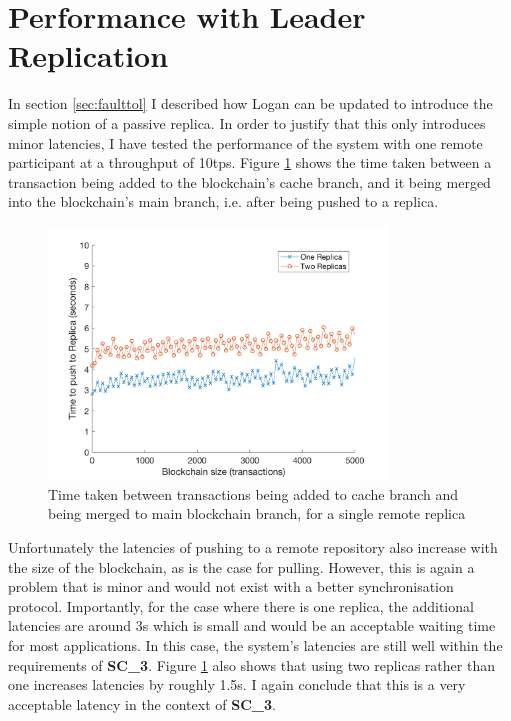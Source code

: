 \documentclass[12pt,a4paper,twoside,openright]{report}
\begin{document}
	\section{Performance with Leader Replication}
	In section \ref{sec:faulttol} I described how Logan can be updated to introduce the simple notion of a passive replica. 
	In order to justify that this only introduces minor latencies, I have tested the performance of the system with one remote participant at a throughput of 10tps. 
	Figure \ref{figs:confirmationtimes}  shows the time taken between a transaction being added to the blockchain's cache branch, and it being merged into the blockchain's main branch, i.e. after being pushed to a replica.
	\begin{figure}
		\centering
		\includegraphics[width=0.8\textwidth]{figs/confirmationlatencies.png}
		\caption{Time taken between transactions being added to cache branch and being merged to main blockchain branch, for a single remote replica}
		\label{figs:confirmationtimes}
	\end{figure}
	Unfortunately the latencies of pushing to a remote repository also increase with the size of the blockchain, as is the case for pulling.
	However, this is again a problem that is minor and would not exist with a better synchronisation protocol. 
	Importantly, for the case where there is one replica, the additional latencies are around 3s which is small and would be an acceptable waiting time for most applications.
	In this case, the system's latencies are still well within the requirements of \textbf{SC\_3}.
	Figure \ref{figs:confirmationtimes} also shows that using two replicas rather than one increases latencies by roughly 1.5s. 
	I again conclude that this is a very acceptable latency in the context of \textbf{SC\_3}.\\
\end{document}
